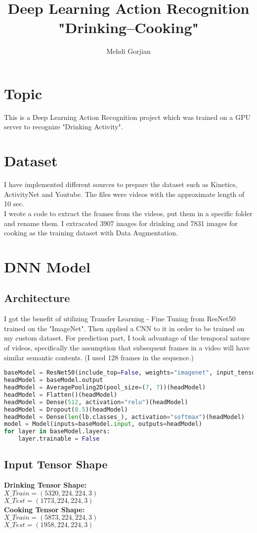 \documentclass{article}
\title{Deep Learning Action Recognition \\ "Drinking--Cooking"}
\author{Mehdi Gorjian }
\date{}
\begin{document}
\maketitle

\section{Topic}
This is a Deep Learning Action Recognition project which was trained on a GPU server to recognize "Drinking Activity".
\section{Dataset}
I have implemented different sources to prepare the dataset such as Kinetics, ActivityNet and Youtube. The files were videos with the approximate length of 10 sec.\\
I wrote a code to extract the frames from the videos, put them in a specific folder and rename them. I extracated 3907 images for drinking and 7831 images for cooking as the training dataset with Data Augmentation.
\section{DNN Model}
\subsection{Architecture}
I got the benefit of utilizing Transfer Learning - Fine Tuning from ResNet50 trained on the "ImageNet". Then applied a CNN to it in order to be trained on my custom dataset. For prediction part, I took advantage of the temporal nature of videos, specifically the assumption that subsequent frames in a video will have similar semantic contents. (I used 128 frames in the sequence.)\\


\begin{lstlisting}[language=python]
baseModel = ResNet50(include_top=False, weights="imagenet", input_tensor=Input(shape=(224, 224, 3)), input_shape=(244,244,3)) 
headModel = baseModel.output
headModel = AveragePooling2D(pool_size=(7, 7))(headModel)
headModel = Flatten()(headModel)
headModel = Dense(512, activation="relu")(headModel)
headModel = Dropout(0.5)(headModel)
headModel = Dense(len(lb.classes_), activation="softmax")(headModel)
model = Model(inputs=baseModel.input, outputs=headModel)
for layer in baseModel.layers:
	layer.trainable = False
\end{lstlisting}
\subsection{Input Tensor Shape}
\textbf{Drinking Tensor Shape:}\\
$X\_Train = (5320, 224,224,3)$\\
$X\_Test = (1773, 224,224,3)$\\
\textbf{Cooking Tensor Shape:}\\
$X\_Train = (5873, 224,224,3)$\\
$X\_Test = (1958, 224,224,3)$
\end{document}
